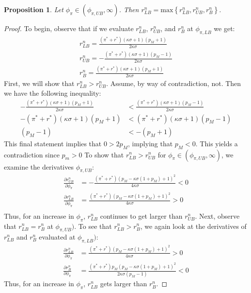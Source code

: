 \documentclass[11pt]{article}
\newtheorem{proposition}{Proposition}
\begin{document}
	\begin{proposition}\label{prop:cPHIpilb}
		Let $\phi_{\pi}\in(\phi_{\pi,UB},\infty)$. Then $r^n_{LB} = \text{max}\left\{r^n_{LB}, r^n_{UB}, r^n_{B}\right\}$. 
	\end{proposition}
	\begin{proof}
		To begin, observe that if we evaluate $r^n_{LB}$, $r^n_{UB}$, and $r^n_{B}$ at $\phi_{\pi,LB}$ we get:
		\begin{align*}
			r^n_{LB} =\frac{(\pi^* + r^*)(\kappa\sigma + 1)(p_M +1)}{2\kappa\sigma}\\
			r^n_{UB} =-\frac{(\pi^* + r^*)(\kappa\sigma + 1)(p_M -1)}{2\kappa\sigma}\\
			r^n_{B} = \frac{(\pi^* + r^*)(\kappa\sigma + 1)(p_M +1)}{2\kappa\sigma}
		\end{align*}
		First, we will show that $r^n_{LB} > r^n_{UB}$. 
		Assume, by way of contradiction, not.  Then we have the following inequality: 
		\begin{align*}
			-\frac{(\pi^* + r^*)(\kappa\sigma + 1)(p_M +1)}{2\kappa\sigma} &< \frac{(\pi^* + r^*)(\kappa\sigma + 1)(p_M -1)}{2\kappa\sigma}\\
			-(\pi^* + r^*)(\kappa\sigma + 1)(p_M +1) &< (\pi^* + r^*)(\kappa\sigma + 1)(p_M -1)\\
			(p_M -1) &< -(p_M +1)
		\end{align*}
		This final statement implies that $0>2p_M$, implying that $p_M<0$. This yields a contradiction since $p_m>0$ To show that  $r^n_{LB} > r^n_{UB}$ for $\phi_{\pi}\in(\phi_{\pi,UB},\infty)$, we examine the derivatives $\phi_{\pi,UB}$: 
		\begin{align*}
			\frac{\partial r^n_{UB}}{\partial \phi_{\pi}} &= -\frac{(\pi^* + r^*)(p_M-\kappa\sigma(1+p_M)+1)^2}{4\kappa\sigma} < 0\\
			\frac{\partial r^n_{LB}}{\partial \phi_{\pi}} &= \frac{(\pi^* + r^*)(p_M-\kappa\sigma(1+p_M)+1)^2}{4\kappa\sigma} > 0\\
		\end{align*}
		Thus, for an increase in  $\phi_{\pi}$, $r^n_{LB}$ continues to get larger than $r^n_{UB}$. 
		Next, observe that $r^n_{LB} = r^n_{B}$ at $\phi_{\pi,UB})$. To see that $r^n_{LB} > r^n_{B}$, we again look at the derivatives of $r^n_{LB}$ and $r^n_{B}$ evaluated at $\phi_{\pi,LB})$:
		\begin{align*}
			\frac{\partial r^n_{LB}}{\partial \phi_{\pi}} &= \frac{(\pi^* + r^*)(p_M-\kappa\sigma(1+p_M)+1)^2}{4\kappa\sigma} > 0\\
			\frac{\partial r^n_{B}}{\partial \phi_{\pi}} &= \frac{(\pi^* + r^*)p_M(p_M-\kappa\sigma(1+p_M)+1)^2}{2\kappa\sigma(p_M -1)} < 0
		\end{align*}
		Thus, for an increase in  $\phi_{\pi}$, $r^n_{LB}$ gets larger than $r^n_{B}$. 
	\end{proof}
\end{document}
